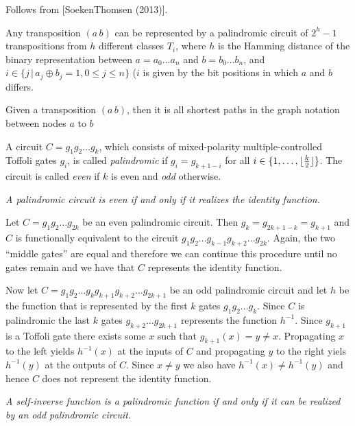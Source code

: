 \smallskip{} Follows from [SoekenThomsen (2013)]. \qquad\slug

\smallskip {} Any transposition $(a\,b)$ can be represented by a palindromic circuit of $2^h-1$ transpositions from $h$ different classes $T_i$, where $h$ is the Hamming distance of the binary representation between $a = a_0...a_n$ and $b = b_0...b_n$, and $i \in \{ j \,|\, a_j \oplus b_j = 1, 0\leq j \leq n\}$ ($i$ is given by the bit positions in which $a$ and $b$ differs.

\smallskip{} Given a transposition $(a\,b)$, then it is all shortest paths in the graph notation between nodes $a$ to $b$ \qquad\slug




\medskip {}\enspace A circuit
$C=g_1g_2\dots g_k$, which consists of mixed-polarity multiple-controlled
Toffoli gates $g_i$, is called {\it palindromic\/} if $ g_i = g_{k+1-i}$ for all
$i \in \{1,\dots,\lfloor{k\over 2}\rfloor\}$.  The circuit is called {\it
even\/} if $k$ is even and {\it odd\/} otherwise.

\smallskip {} \sl A palindromic circuit is even if and only
if it realizes the identity function. \rm

\smallskip{} Let $C=g_1g_2\dots g_{2k}$ be an even
palindromic circuit.  Then $g_{k}=g_{2k+1-k}=g_{k+1}$ and $C$ is functionally
equivalent to the circuit $g_1g_2\dots g_{k-1}g_{k+2} \dots g_{2k}$.  Again, the
two ``middle gates'' are equal and therefore we can continue this procedure
until no gates remain and we have that $C$ represents the identity function.

Now let $C=g_1g_2\dots g_kg_{k+1}g_{k+2}\dots g_{2k+1}$ be an odd palindromic
circuit and let $h$ be the function that is represented by the first $k$ gates
$g_1g_2\dots g_k$.  Since $C$ is palindromic the last $k$ gates $g_{k+2}\dots
g_{2k+1}$ represents the function $h^{-1}$.  Since $g_{k+1}$ is a Toffoli gate
there exists some $x$ such that $g_{k+1}(x)=y\neq x$.  Propagating $x$ to the
left yields $h^{-1}(x)$ at the inputs of $C$ and propagating $y$ to the right
yiels $h^{-1}(y)$ at the outputs of $C$.  Since $x\neq y$ we also have
$h^{-1}(x)\neq h^{-1}(y)$ and hence $C$ does not represent the identity
function.\qquad\slug

 \sl A self-inverse function is a palindromic function if
and only if it can be realized by an odd palindromic circuit. \rm


